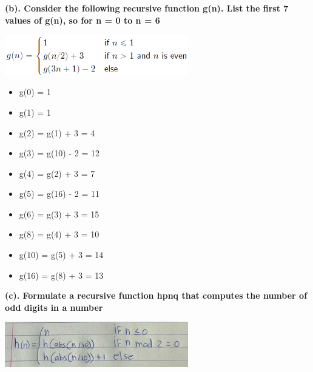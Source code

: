 \documentclass[a4paper]{article}
\begin{document}
\textbf{(b). Consider the following recursive function g(n). List the first 7 values of g(n), so for n = 0 to n = 6}
\begin{center}
    \includegraphics[width=0.6\textwidth]{images/2b.png}\\[1cm]
\end{center}

\begin{itemize}
    \item g(0) = 1
    \item g(1) = 1
    \item g(2) = g(1) + 3 = 4
    \item g(3) = g(10) - 2 = 12
    \item g(4) = g(2) + 3 = 7
    \item g(5) = g(16) - 2 = 11
    \item g(6) = g(3) + 3 = 15
    \item g(8) = g(4) + 3 = 10
    \item g(10) = g(5) + 3 = 14
    \item g(16) = g(8) + 3 = 13
\end{itemize}

\newpage

\textbf{(c). Formulate a recursive function hpnq that computes the number of odd digits in a number}
\begin{center}
    \includegraphics[width=0.6\textwidth]{images/2c.jpeg}\\[1cm]
\end{center}

\newpage
\end{document}
